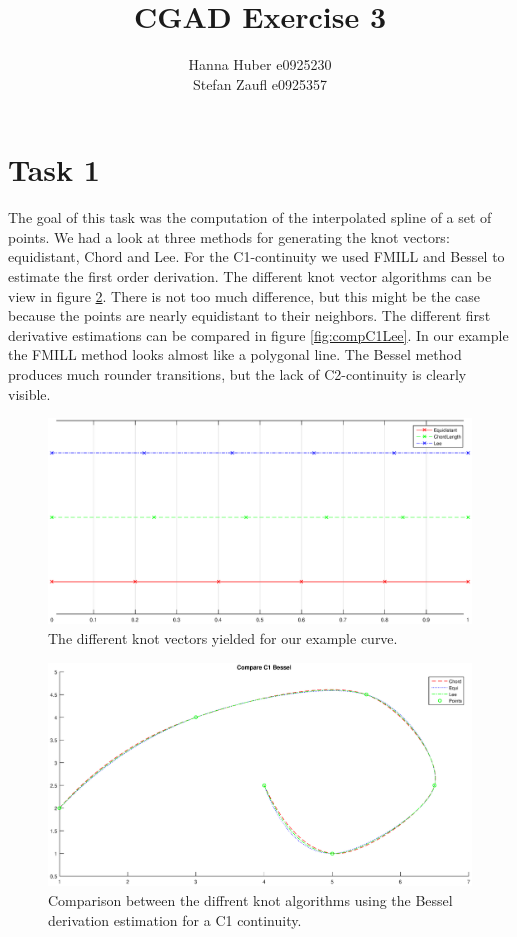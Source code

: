 \documentclass[12pt,a4paper]{article}
\title{CGAD Exercise 3}
\author{Hanna Huber e0925230\\Stefan Zaufl e0925357}
\begin{document}
\maketitle
\section{Task 1}
The goal of this task was the computation of the interpolated spline of a set of points. We had a look at three methods for generating the knot vectors: equidistant, Chord and Lee. For the C1-continuity we used FMILL and Bessel to estimate the first order derivation. The different knot vector algorithms can be view in figure \ref{fig:compC1Bessel}. There is not too much difference, but this might be the case because the points are nearly equidistant to their neighbors.
The different first derivative estimations can be compared in figure \ref{fig:compC1Lee}. In our example the FMILL method looks almost like a polygonal line. The Bessel method produces much rounder transitions, but the lack of C2-continuity is clearly visible.

\begin{figure}[hbtp]
\centering
\includegraphics[width=\textwidth]{knotvectors.eps}
\caption{The different knot vectors yielded for our example curve.}
\label{fig:knotvec}
\end{figure}

\begin{figure}[hbtp]
\centering
\includegraphics[width=\textwidth]{compC1Bessel.eps}
\caption{Comparison between the diffrent knot algorithms using the Bessel derivation estimation for a C1 continuity.}
\label{fig:compC1Bessel}
\end{figure}
\end{document}
